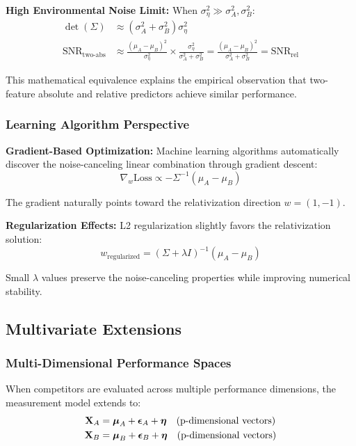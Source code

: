 \textbf{High Environmental Noise Limit:}
When $\sigma_\eta^2 \gg \sigma_A^2, \sigma_B^2$:
\begin{align}
\det(\Sigma) &\approx (\sigma_A^2 + \sigma_B^2)\sigma_\eta^2 \\
\text{SNR}_{\text{two-abs}} &\approx \frac{(\mu_A - \mu_B)^2}{\sigma_\eta^2} \times \frac{\sigma_\eta^2}{\sigma_A^2 + \sigma_B^2} = \frac{(\mu_A - \mu_B)^2}{\sigma_A^2 + \sigma_B^2} = \text{SNR}_{\text{rel}}
\end{align}

This mathematical equivalence explains the empirical observation that two-feature absolute and relative predictors achieve similar performance.

\subsubsection{Learning Algorithm Perspective}

\textbf{Gradient-Based Optimization:} Machine learning algorithms automatically discover the noise-canceling linear combination through gradient descent:
\begin{equation}
\nabla_w \text{Loss} \propto -\Sigma^{-1}(\mu_A - \mu_B)
\end{equation}

The gradient naturally points toward the relativization direction $w = (1, -1)$.

\textbf{Regularization Effects:} L2 regularization slightly favors the relativization solution:
\begin{equation}
w_{\text{regularized}} = (\Sigma + \lambda I)^{-1}(\mu_A - \mu_B)
\end{equation}

Small $\lambda$ values preserve the noise-canceling properties while improving numerical stability.

\subsection{Multivariate Extensions}

\subsubsection{Multi-Dimensional Performance Spaces}

When competitors are evaluated across multiple performance dimensions, the measurement model extends to:
\begin{align}
\mathbf{X}_A &= \boldsymbol{\mu}_A + \boldsymbol{\epsilon}_A + \boldsymbol{\eta} \quad \text{(p-dimensional vectors)} \\
\mathbf{X}_B &= \boldsymbol{\mu}_B + \boldsymbol{\epsilon}_B + \boldsymbol{\eta} \quad \text{(p-dimensional vectors)}
\end{align}

